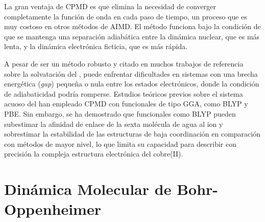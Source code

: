 La gran ventaja de CPMD es que elimina la necesidad de converger completamente la función de onda en cada paso de tiempo, un proceso que es muy costoso en otros métodos de AIMD. El método funciona bajo la condición de que se mantenga una separación adiabática entre la dinámica nuclear, que es más lenta, y la dinámica electrónica ficticia, que es más rápida.

A pesar de ser un método robusto y citado en muchos trabajos de referencia sobre la solvatación del  , puede enfrentar dificultades en sistemas con una brecha energética (\textit{gap}) pequeña o nula entre los estados electrónicos, donde la condición de adiabaticidad podría romperse. Estudios teóricos previos sobre el sistema acuoso del  han empleado CPMD con funcionales de tipo GGA, como BLYP y PBE. Sin embargo, se ha demostrado que funcionales como BLYP pueden subestimar la afinidad de enlace de la sexta molécula de agua al ion y sobrestimar la estabilidad de las estructuras de baja coordinación en comparación con métodos de mayor nivel, lo que limita su capacidad para describir con precisión la compleja estructura electrónica del cobre(II).

\section{Dinámica Molecular de Bohr-Oppenheimer}
